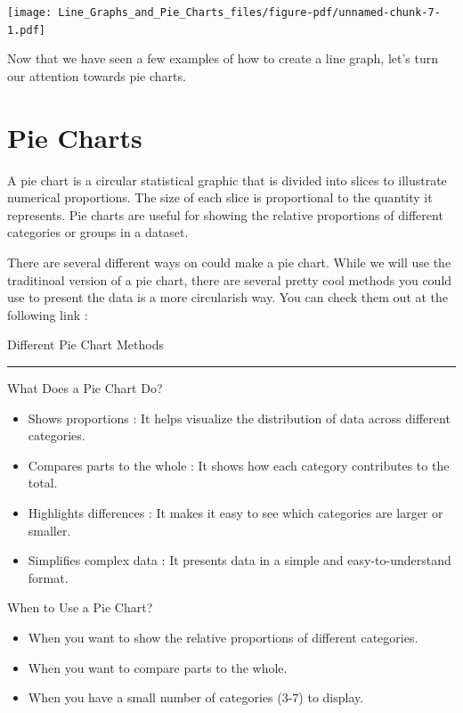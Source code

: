 \documentclass[
  letterpaper,
  DIV=11,
  numbers=noendperiod]{scrreprt}
\providecommand{\tightlist}{%
  \setlength{\itemsep}{0pt}\setlength{\parskip}{0pt}}\usepackage{longtable,booktabs,array}
\begin{document}
\texttt{[image: Line\_Graphs\_and\_Pie\_Charts\_files/figure-pdf/unnamed-chunk-7-1.pdf]}

Now that we have seen a few examples of how to create a line graph,
let's turn our attention towards pie charts.

\section*{Pie Charts}\label{pie-charts}


A pie chart is a circular statistical graphic that is divided into
slices to illustrate numerical proportions. The size of each slice is
proportional to the quantity it represents. Pie charts are useful for
showing the relative proportions of different categories or groups in a
dataset.

There are several different ways on could make a pie chart. While we
will use the traditinoal version of a pie chart, there are several
pretty cool methods you could use to present the data is a more
circularish way. You can check them out at the following link :

Different Pie Chart Methods

\begin{center}\rule{0.5\linewidth}{0.5pt}\end{center}

What Does a Pie Chart Do?

\begin{itemize}
\tightlist
\item
  Shows proportions : It helps visualize the distribution of data across
  different categories.
\item
  Compares parts to the whole : It shows how each category contributes
  to the total.
\item
  Highlights differences : It makes it easy to see which categories are
  larger or smaller.
\item
  Simplifies complex data : It presents data in a simple and
  easy-to-understand format.
\end{itemize}

When to Use a Pie Chart?

\begin{itemize}
\tightlist
\item
  When you want to show the relative proportions of different
  categories.
\item
  When you want to compare parts to the whole.
\item
  When you have a small number of categories (3-7) to display.
\end{itemize}
\end{document}
